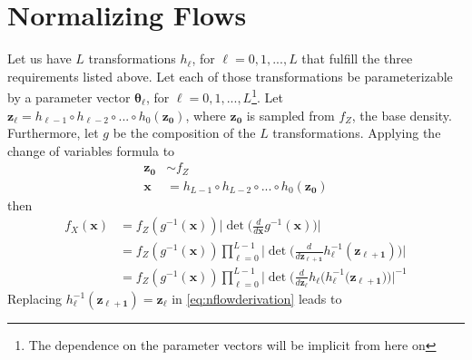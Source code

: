 \section{Normalizing Flows}
Let us have $L$ transformations $h_\ell$, for $\ell = 0, 1, ..., L$ that fulfill the
three requirements listed above. Let each of those transformations be parameterizable
by a parameter vector $\bm\theta_\ell$, for $\ell = 0, 1, ..., L$\footnote{The
dependence on the parameter vectors will be implicit from here on}.
Let $\bm{z_\ell} = h_{\ell-1} \circ h_{\ell-2} \circ ... \circ h_0(\bm{z_0})$, where
$\bm{z_0}$ is sampled from $f_Z$, the base density. Furthermore, let $g$ be the
composition of the $L$ transformations. Applying the change of variables formula to
\begin{align}
    \bm{z_0} &\sim f_Z \\
    \bm{x} &= h_{L-1} \circ h_{L-2} \circ ... \circ h_0(\bm{z_0})
\end{align}
then
\begin{align}
    f_X(\bm{x}) &= f_Z(g^{-1}(\bm{x}))\Big|\det\Big(\frac{d}{d\bm{x}}g^{-1}(\bm{x})\Big)\Big| \\
                        &= f_Z(g^{-1}(\bm{x}))\prod_{\ell=0}^{L-1}\Big|\det\Big(\frac{d}{d\bm{z_{\ell+1}}}h_{\ell}^{-1}(\bm{z_{\ell+1}})\Big)\Big| \\
                        &= f_Z(g^{-1}(\bm{x}))\prod_{\ell=0}^{L-1}\Big|\det\Big(\frac{d}{d\bm{z_{\ell}}}h_{\ell}\Big(h_{\ell}^{-1}(\bm{z_{\ell+1}}\Big)\Big)\Big|^{-1} \label{eq:nflowderivation}
\end{align}
Replacing $h_{\ell}^{-1}(\bm{z_{\ell+1}}) = \bm{z_\ell}$ in \ref{eq:nflowderivation} leads to

